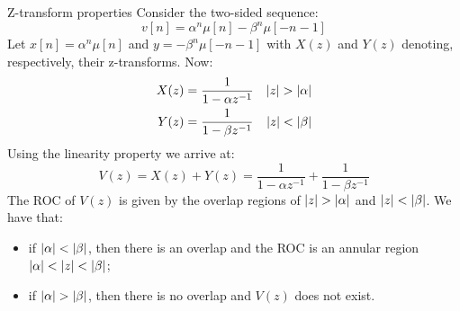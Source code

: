 \documentclass[../../main/main.tex]{subfiles}
\begin{document}
\begin{example}{Z-transform properties}{}
    Consider the two-sided sequence:
    \begin{equation}
        v[n]
        =
        \alpha^{n} \mu[n] - \beta^{n} \mu[-n-1]
        \label{eq:L14_S65_1}
    \end{equation}
    Let \( x[n] = \alpha^{n} \mu[n] \) and \( y = - \beta^{n} \mu[-n-1] \) with \( X(z) \) and \( Y(z) \) denoting, respectively, their z-transforms. Now:
    \begin{align}
        X(z) &= \frac{1}{1 - \alpha z^{-1}}   &   \abs{z} > \abs{\alpha}  \\
        Y(z) &= \frac{1}{1 - \beta z^{-1}}  &   \abs{z} < \abs{\beta}
    \end{align}
    Using the linearity property we arrive at:
    \begin{equation}
        V(z)
        =
        X(z) + Y(z)
        =
        \frac{1}{1 - \alpha z^{-1}} + \frac{1}{1 - \beta z^{-1}}
        \label{eq:L14_S66_1}
    \end{equation}
    The ROC of \( V(z) \) is given by the overlap regions of \( \abs{z} > \abs{\alpha} \) and \( \abs{z} < \abs{\beta} \). We have that:
    \begin{itemize}
        \item if \( \abs{\alpha} < \abs{\beta} \), then there is an overlap and the ROC is an annular region \( \abs{\alpha} < \abs{z} < \abs{\beta} \);
        \item if \( \abs{\alpha} > \abs{\beta} \), then there is no overlap and \( V(z) \) does not exist.
    \end{itemize}
\end{example}
\end{document}
